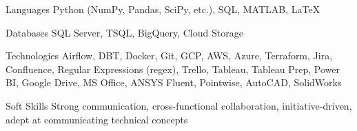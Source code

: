 
\begin{cvskills}
  \cvskill
    {Languages} %
    {Python (NumPy, Pandas, SciPy, etc.), SQL, MATLAB, LaTeX} %
  
  \cvskill
    {Databases} %
    {SQL Server, TSQL, BigQuery, Cloud Storage} %
    
  \cvskill
    {Technologies} %
    {Airflow, DBT, Docker, Git, GCP, AWS, Azure, Terraform, Jira, Confluence, Regular Expressions (regex), Trello, Tableau, Tableau Prep, Power BI, Google Drive, MS Office, ANSYS Fluent, Pointwise, AutoCAD, SolidWorks} %
    
  \cvskill
    {Soft Skills} %
    {Strong communication, cross-functional collaboration, initiative-driven, adept at communicating technical concepts}

\end{cvskills}
